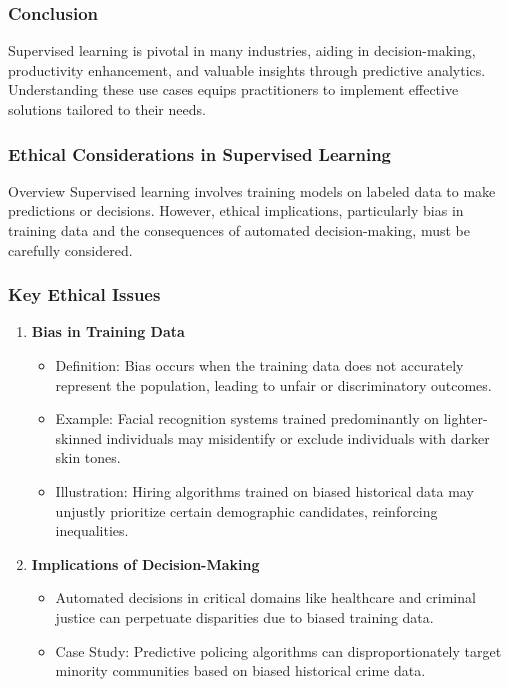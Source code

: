 \documentclass[aspectratio=169]{beamer}
\begin{document}
\begin{frame}
    \frametitle{Conclusion}
    Supervised learning is pivotal in many industries, aiding in decision-making, productivity enhancement, and valuable insights through predictive analytics. Understanding these use cases equips practitioners to implement effective solutions tailored to their needs.
\end{frame}

\begin{frame}[fragile]
    \frametitle{Ethical Considerations in Supervised Learning}
    \begin{block}{Overview}
        Supervised learning involves training models on labeled data to make predictions or decisions. However, ethical implications, particularly bias in training data and the consequences of automated decision-making, must be carefully considered.
    \end{block}
\end{frame}

\begin{frame}[fragile]
    \frametitle{Key Ethical Issues}
    \begin{enumerate}
        \item \textbf{Bias in Training Data}
        \begin{itemize}
            \item Definition: Bias occurs when the training data does not accurately represent the population, leading to unfair or discriminatory outcomes.
            \item Example: Facial recognition systems trained predominantly on lighter-skinned individuals may misidentify or exclude individuals with darker skin tones.
            \item Illustration: Hiring algorithms trained on biased historical data may unjustly prioritize certain demographic candidates, reinforcing inequalities.
        \end{itemize}
        
        \item \textbf{Implications of Decision-Making}
        \begin{itemize}
            \item Automated decisions in critical domains like healthcare and criminal justice can perpetuate disparities due to biased training data.
            \item Case Study: Predictive policing algorithms can disproportionately target minority communities based on biased historical crime data.
        \end{itemize}
    \end{enumerate}
\end{frame}
\end{document}
